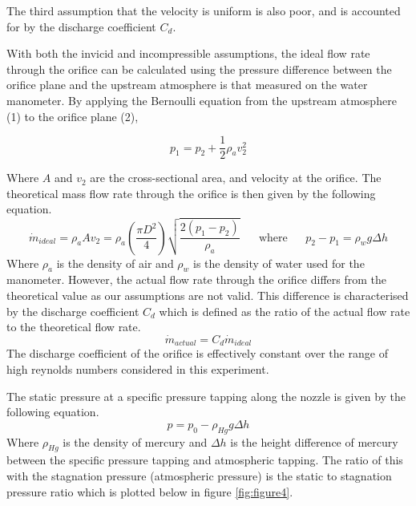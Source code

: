 \documentclass[8pt]{article}
\begin{document}
The third assumption that the velocity is uniform is also poor, and is accounted for by the discharge coefficient $C_d$.

\hfill

With both the invicid and incompressible assumptions, the ideal flow rate through the orifice can be calculated using the pressure difference between the orifice plane and the upstream atmosphere is that measured on the
water manometer. By applying the Bernoulli equation from the upstream atmosphere (1) to the orifice plane (2),

\begin{equation}
    p_1 = p_2 + \frac{1}{2} \rho_a v_2^2
\end{equation}

Where $A$ and $v_2$ are the cross-sectional area, and velocity at the orifice. The theoretical mass flow rate through the orifice is then given by the following equation.
\begin{equation}
    \dot{m}_{ideal} = \rho_a A v_2 = \rho_a \left( \frac{\pi D^2}{4}\right) \sqrt{\frac{2(p_1-p_2)}{\rho_a}} \;\;\;\;\;\; \text{where} \;\;\;\;\;\ p_2 - p_1 = \rho_w g \Delta h
\end{equation}
Where $\rho_a$ is the density of air and $\rho_w$ is the density of water used for the manometer.
However, the actual flow rate through the orifice differs from the theoretical value as our assumptions are not valid.
This difference is characterised by the discharge coefficient $C_d$ which is defined as the ratio of the actual flow rate to the theoretical flow rate.
\begin{equation}
    \dot{m}_{actual} = C_d \dot{m}_{ideal}
\end{equation}
The discharge coefficient of the orifice is effectively constant over the range of high reynolds numbers considered in this experiment. 

The static pressure at a specific pressure tapping along the nozzle is given by the following equation.
\begin{equation}
    p = p_0 - \rho_{Hg} g \Delta h
\end{equation}
Where $\rho_{Hg}$ is the density of mercury and $\Delta h$ is the height difference of mercury between the specific pressure tapping and atmospheric tapping.
The ratio of this with the stagnation pressure (atmospheric pressure) is the static to stagnation pressure ratio which is plotted below in figure \ref{fig:figure4}.
\end{document}
